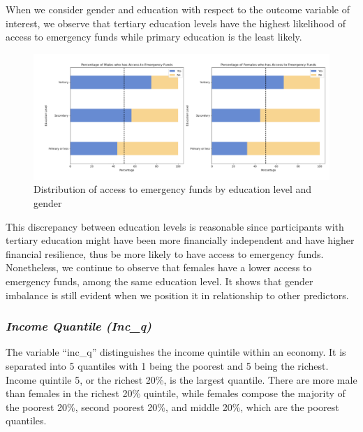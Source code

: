 \documentclass[12pt]{article}
\begin{document}
When we consider gender and education with respect to the outcome
variable of interest, we observe that tertiary education levels have the
highest likelihood of access to emergency funds while primary education
is the least likely.

\begin{figure}

{\centering \includegraphics[width=1\linewidth]{graphs/f24_graph5} 

}

\caption{Distribution of access to emergency funds by education level and gender}\label{fig:unnamed-chunk-8}
\end{figure}

This discrepancy between education levels is reasonable since
participants with tertiary education might have been more financially
independent and have higher financial resilience, thus be more likely to
have access to emergency funds. Nonetheless, we continue to observe that
females have a lower access to emergency funds, among the same education
level. It shows that gender imbalance is still evident when we position
it in relationship to other predictors.

\hypertarget{income-quantile-inc_q}{%
\subsubsection{\texorpdfstring{\emph{Income Quantile
(Inc\_q)}}{Income Quantile (Inc\_q)}}\label{income-quantile-inc_q}}

The variable ``inc\_q'' distinguishes the income quintile within an
economy. It is separated into 5 quantiles with 1 being the poorest and 5
being the richest. Income quintile 5, or the richest 20\%, is the
largest quantile. There are more male than females in the richest 20\%
quintile, while females compose the majority of the poorest 20\%, second
poorest 20\%, and middle 20\%, which are the poorest quantiles.
\end{document}
